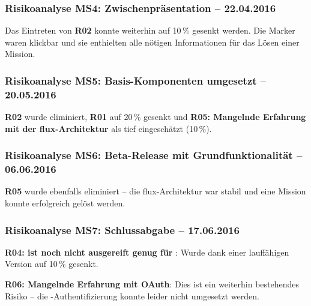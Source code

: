 \subsubsection{Risikoanalyse MS4: Zwischenpräsentation -- 22.04.2016}
Das Eintreten von \textbf{R02} konnte weiterhin auf 10\,\% gesenkt werden. Die Marker waren klickbar und sie enthielten alle nötigen Informationen für das Lösen einer Mission.

\subsubsection{Risikoanalyse MS5: Basis-Komponenten umgesetzt -- 20.05.2016}
\textbf{R02} wurde eliminiert, \textbf{R01} auf 20\,\% gesenkt und \textbf{R05: Mangelnde Erfahrung mit der flux-Architektur} als tief eingeschätzt (10\,\%).

\subsubsection{Risikoanalyse MS6: Beta-Release mit Grundfunktionalität -- 06.06.2016}
\textbf{R05} wurde ebenfalls eliminiert -- die flux-Architektur war stabil und eine Mission konnte erfolgreich gelöst werden.

\subsubsection{Risikoanalyse MS7: Schlussabgabe -- 17.06.2016}
\textbf{R04:  ist noch nicht ausgereift genug für }: Wurde dank einer lauffähigen Version auf 10\,\% gesenkt.

\textbf{R06: Mangelnde Erfahrung mit OAuth}: Dies ist ein weiterhin bestehendes Risiko -- die -Authentifizierung konnte leider nicht umgesetzt werden.